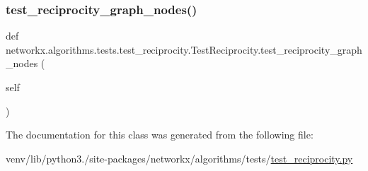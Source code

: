 \subsubsection{\texorpdfstring{test\+\_\+reciprocity\+\_\+graph\+\_\+nodes()}{test\_reciprocity\_graph\_nodes()}}
{\footnotesize\ttfamily def networkx.\+algorithms.\+tests.\+test\+\_\+reciprocity.\+Test\+Reciprocity.\+test\+\_\+reciprocity\+\_\+graph\+\_\+nodes (\begin{DoxyParamCaption}\item[{}]{self }\end{DoxyParamCaption})}



The documentation for this class was generated from the following file\+:\begin{DoxyCompactItemize}
\item 
venv/lib/python3./site-\/packages/networkx/algorithms/tests/\hyperlink{test__reciprocity_8py}{test\+\_\+reciprocity.\+py}\end{DoxyCompactItemize}
